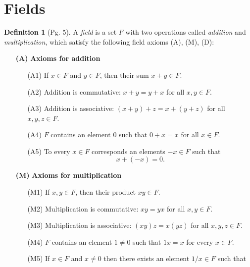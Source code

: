 \documentclass[leqno]{article}
\theoremstyle{definition}
\newtheorem{definition}{Definition}[section]
\theoremstyle{remark}
\begin{document}
    \section{Fields}
        \begin{definition}[Pg. 5]\label{def:1.6}
            A \emph{field} is a set $F$ with two operations called \emph{addition} and \emph{multiplication}, which satisfy the following field axioms (A), (M), (D):
                \begin{enumerate}
                    \item[\textbf{(A)}] \textbf{Axioms for addition} 
                        \begin{enumerate}
                            \item[(A1)] If $x\in F$ and $y\in F$, then their sum $x+y\in F$.
                            \item[(A2)] Addition is commutative: $x+y=y+x$ for all $x,y\in F$.
                            \item[(A3)] Addition is associative: $(x+y)+z=x+(y+z)$ for all $x,y,z\in F$.
                            \item[(A4)] $F$ contains an element 0 such that $0+x=x$ for all $x\in F$.
                            \item[(A5)] To every $x\in F$ corresponds an elements $-x\in F$ such that 
                                \begin{equation*}
                                    x+(-x)=0.
                                \end{equation*}
                        \end{enumerate}
                    \item[\textbf{(M)}] \textbf{Axioms for multiplication}
                        \begin{enumerate}
                            \item[(M1)] If $x,y\in F$, then their product $xy\in F$.
                            \item[(M2)] Multiplication is commutative: $xy=yx$ for all $x,y\in F$.
                            \item[(M3)] Multiplication is associative: $(xy)z=x(yz)$ for all $x,y,z\in F$.
                            \item[(M4)] $F$ contains an element $1\neq 0$ such that $1x=x$ for every $x\in F$.
                            \item[(M5)] If $x\in F$ and $x\neq 0$ then there exists an element $1/x\in F$ such that 

\end{enumerate}
\end{enumerate}
\end{definition}
\end{document}
